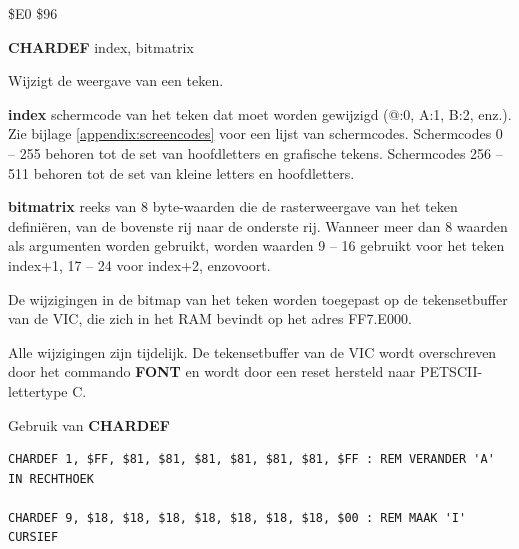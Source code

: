 \begin{description}[leftmargin=2cm,style=nextline]
\item [Token:]   \$E0 \$96

\item [Formaat:]  {\bf CHARDEF} index, bitmatrix

\item [Gebruik:]   Wijzigt de weergave van een teken.

                 {\bf index} schermcode van het teken dat moet worden gewijzigd (@:0, A:1, B:2, enz.). Zie bijlage \vref{appendix:screencodes} voor een lijst van schermcodes. Schermcodes 0 -- 255 behoren tot de set van hoofdletters en grafische tekens. Schermcodes 256 -- 511 behoren tot de set van kleine letters en hoofdletters.

                 {\bf bitmatrix} reeks van 8 byte-waarden die de rasterweergave van het teken definiëren, van de bovenste rij naar de onderste rij. Wanneer meer dan 8 waarden als argumenten worden gebruikt, worden waarden 9 -- 16 gebruikt voor het teken index+1, 17 -- 24 voor index+2, enzovoort.

\item [Opmerkingen:] De wijzigingen in de bitmap van het teken worden toegepast op de tekensetbuffer van de VIC, die zich in het RAM bevindt op het adres FF7.E000.

                 Alle wijzigingen zijn tijdelijk. De tekensetbuffer van de VIC wordt overschreven door het commando {\bf FONT} en wordt door een reset hersteld naar PETSCII-lettertype C.

\item [Voorbeelden:] Gebruik van {\bf CHARDEF}

\begin{tcolorbox}[colback=black,coltext=white]
\verbatimfont{\codefont}
\begin{verbatim}
CHARDEF 1, $FF, $81, $81, $81, $81, $81, $81, $FF : REM VERANDER 'A' IN RECHTHOEK

CHARDEF 9, $18, $18, $18, $18, $18, $18, $18, $00 : REM MAAK 'I' CURSIEF
\end{verbatim}
\end{tcolorbox}
\end{description}


\newpage
